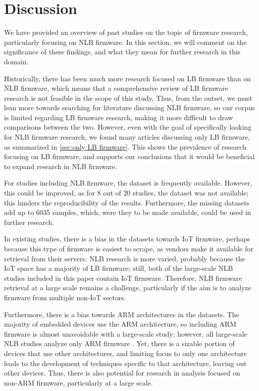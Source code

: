 \section{Discussion}\label{s:discussion}
We have provided an overview of past studies on the topic of firmware research, particularly focusing on NLB firmware.
In this section, we will comment on the significance of these findings, and what they mean for further research in this domain.

Historically, there has been much more research focused on LB firmware than on NLB firmware, which means that a comprehensive review of LB firmware research is not feasible in the scope of this study,
Thus, from the outset, we must lean more towards searching for literature discussing NLB firmware, so our corpus is limited regarding LB firmware research, making it more difficult to draw comparisons between the two.
However, even with the goal of specifically looking for NLB firmware research, we found many articles discussing only LB firmware, as summarized in \autoref{sec:only LB firmware}.
This shows the prevalence of research focusing on LB firmware, and supports our conclusions that it would be beneficial to expand research in NLB firmware.

For studies including NLB firmware, the dataset is frequently available.
However, this could be improved, as for 8 out of 20 studies, the dataset was not available; this hinders the reproducibility of the results.
Furthermore, the missing datasets add up to \num{6035} samples, which, were they to be made available, could be used in further research.

In existing studies, there is a bias in the datasets towards IoT firmware, perhaps because this type of firmware is easiest to scrape, as vendors make it available for retrieval from their servers.
NLB research is more varied, probably because the IoT space has a majority of LB firmware; still, both of the large-scale NLB studies included in this paper contain IoT firmware.
Therefore, NLB firmware retrieval at a large scale remains a challenge, particularly if the aim is to analyze firmware from multiple non-IoT sectors.

Furthermore, there is a bias towards ARM architectures in the datasets.
The majority of embedded devices use the ARM architecture, so including ARM firmware is almost unavoidable with a large-scale study; however, all large-scale NLB studies analyze only ARM firmware \cite{gritti2022heapster,wen2020firmxray}.
Yet, there is a sizable portion of devices that use other architectures, and limiting focus to only one architecture leads to the development of techniques specific to that architecture, leaving out other devices.
Thus, there is also potential for research in analysis focused on non-ARM firmware, particularly at a large scale.

